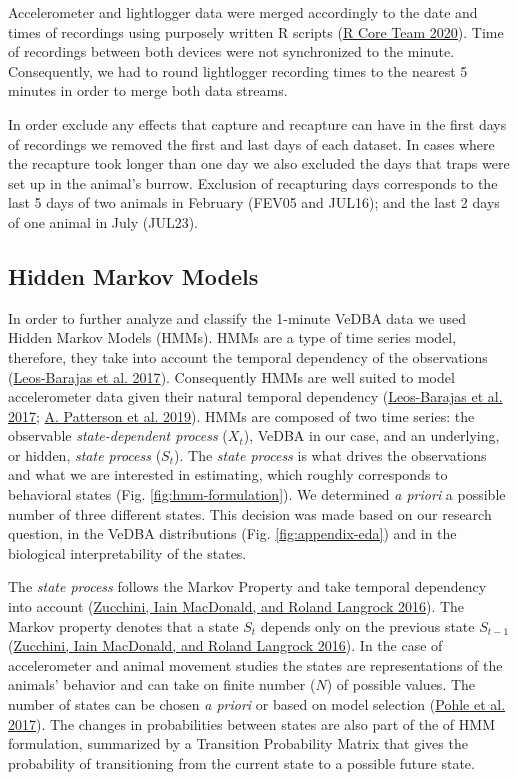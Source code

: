 \documentclass[english,msc,numbers,hidelinks]{coppe}
\begin{document}
  Accelerometer and lightlogger data were merged accordingly to the date and times of recordings using purposely written R scripts (\protect\hyperlink{ref-rcoreteam2020}{R Core Team 2020}). Time of recordings between both devices were not synchronized to the minute. Consequently, we had to round lightlogger recording times to the nearest 5 minutes in order to merge both data streams.

  In order exclude any effects that capture and recapture can have in the first days of recordings we removed the first and last days of each dataset. In cases where the recapture took longer than one day we also excluded the days that traps were set up in the animal's burrow. Exclusion of recapturing days corresponds to the last 5 days of two animals in February (FEV05 and JUL16); and the last 2 days of one animal in July (JUL23).

  \hypertarget{hidden-markov-models}{%
  \subsection{Hidden Markov Models}\label{hidden-markov-models}}

  In order to further analyze and classify the 1-minute VeDBA data we used Hidden Markov Models (HMMs). HMMs are a type of time series model, therefore, they take into account the temporal dependency of the observations (\protect\hyperlink{ref-leosbarajas2017}{Leos-Barajas et al. 2017}). Consequently HMMs are well suited to model accelerometer data given their natural temporal dependency (\protect\hyperlink{ref-leosbarajas2017}{Leos-Barajas et al. 2017}; \protect\hyperlink{ref-patterson2019}{A. Patterson et al. 2019}). HMMs are composed of two time series: the observable \emph{state-dependent process} (\(X_t\)), VeDBA in our case, and an underlying, or hidden, \emph{state process} (\(S_t\)). The \emph{state process} is what drives the observations and what we are interested in estimating, which roughly corresponds to behavioral states (Fig. \ref{fig:hmm-formulation}). We determined \emph{a priori} a possible number of three different states. This decision was made based on our research question, in the VeDBA distributions (Fig. \ref{fig:appendix-eda}) and in the biological interpretability of the states.

  The \emph{state process} follows the Markov Property and take temporal dependency into account (\protect\hyperlink{ref-zucchini2016}{Zucchini, Iain MacDonald, and Roland Langrock 2016}). The Markov property denotes that a state \(S_t\) depends only on the previous state \(S_{t-1}\) (\protect\hyperlink{ref-zucchini2016}{Zucchini, Iain MacDonald, and Roland Langrock 2016}). In the case of accelerometer and animal movement studies the states are representations of the animals' behavior and can take on finite number (\(N\)) of possible values. The number of states can be chosen \emph{a priori} or based on model selection (\protect\hyperlink{ref-pohle2017}{Pohle et al. 2017}). The changes in probabilities between states are also part of the of HMM formulation, summarized by a Transition Probability Matrix that gives the probability of transitioning from the current state to a possible future state.
\end{document}
